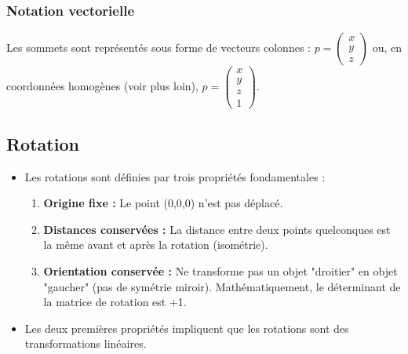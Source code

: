 \documentclass{article}
\begin{document}
\subsubsection{Notation vectorielle}
Les sommets sont représentés sous forme de vecteurs colonnes :
$p = \begin{pmatrix} x \\ y \\ z \end{pmatrix}$ ou, en coordonnées homogènes (voir plus loin), $p = \begin{pmatrix} x \\ y \\ z \\ 1 \end{pmatrix}$.

\subsection{Rotation}

\begin{itemize}
    \item Les rotations sont définies par trois propriétés fondamentales :
        \begin{enumerate}
            \item \textbf{Origine fixe :} Le point (0,0,0) n'est pas déplacé.
            \item \textbf{Distances conservées :} La distance entre deux points quelconques est la même avant et après la rotation (isométrie).
            \item \textbf{Orientation conservée :} Ne transforme pas un objet "droitier" en objet "gaucher" (pas de symétrie miroir). Mathématiquement, le déterminant de la matrice de rotation est +1.
        \end{enumerate}
    \item Les deux premières propriétés impliquent que les rotations sont des transformations linéaires.
\end{itemize}
\end{document}
